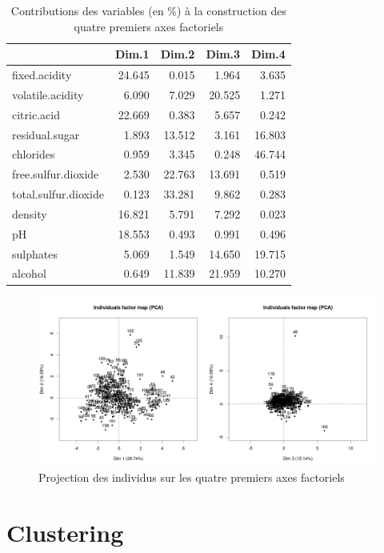 \documentclass[11pt,a4paper]{article}
\begin{document}
\begin{table}[h]
	\centering
	\begin{tabular}{lrrrr}
		\hline
		& Dim.1 & Dim.2 & Dim.3 & Dim.4 \\ 
		\hline
		fixed.acidity & 24.645 & 0.015 & 1.964 & 3.635 \\ 
		volatile.acidity & 6.090 & 7.029 & 20.525 & 1.271 \\ 
		citric.acid & 22.669 & 0.383 & 5.657 & 0.242 \\ 
		residual.sugar & 1.893 & 13.512 & 3.161 & 16.803 \\ 
		chlorides & 0.959 & 3.345 & 0.248 & 46.744 \\ 
		free.sulfur.dioxide & 2.530 & 22.763 & 13.691 & 0.519 \\ 
		total.sulfur.dioxide & 0.123 & 33.281 & 9.862 & 0.283 \\ 
		density & 16.821 & 5.791 & 7.292 & 0.023 \\ 
		pH & 18.553 & 0.493 & 0.991 & 0.496 \\ 
		sulphates & 5.069 & 1.549 & 14.650 & 19.715 \\ 
		alcohol & 0.649 & 11.839 & 21.959 & 10.270 \\ 
		\hline
	\end{tabular}
\caption{Contributions des variables (en \%) à la construction des quatre premiers axes factoriels }
\label{table:pcacontrib}
\end{table}

\begin{figure}[h]
	\includegraphics[width=\textwidth, keepaspectratio]{pcaind}
	\caption{Projection des individus sur les quatre premiers axes factoriels}
	\label{fig:pcaind}
\end{figure}
\FloatBarrier

\section{Clustering}
\end{document}
